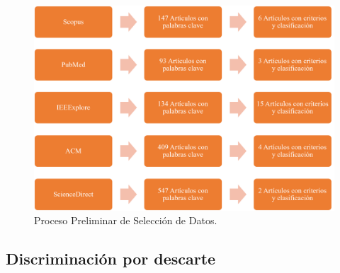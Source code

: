 \documentclass[letterpaper]{article}
\begin{document}
        \begin{figure}[H]
    		\centering
    		\includegraphics[width=1\columnwidth]{graficos/preseleccion.png}
    		\caption{Proceso Preliminar de Selección de Datos.}
    		\label{preseleccion}
    	\end{figure}

   \subsection{Discriminación por descarte}
   
\end{document}
